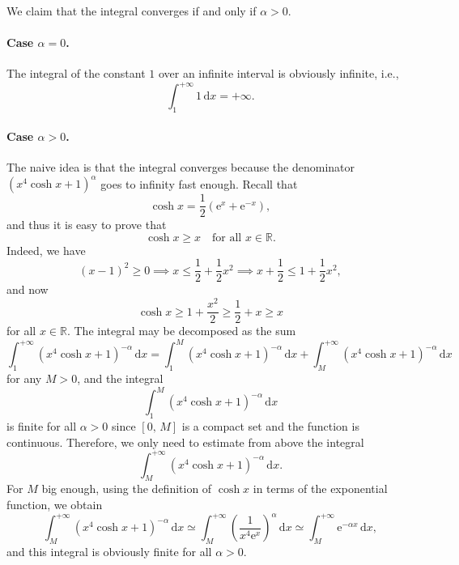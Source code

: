 \documentclass[a4paper,10 pt]{report}
\theoremstyle{definition}
\newcommand{\R}{\mathbb R}
\begin{document}
\begin{solutionBox} We claim that the integral converges if and only if $\alpha > 0$.

\paragraph{Case $\alpha = 0$.} The integral of the constant $1$ over an infinite interval is obviously infinite, i.e.,
\begin{equation*} \int_1^{+ \infty} 1 \, \mathrm{d}x = + \infty. \end{equation*}

\paragraph{Case $\alpha > 0$.} The naive idea is that the integral converges because the denominator $(x^4 \cosh x + 1)^\alpha$ goes to infinity fast enough. Recall that
\begin{equation*}\cosh x = \frac{1}{2} ( \mathrm{e}^x + \mathrm{e}^{-x} ), \end{equation*}
and thus it is easy to prove that
\begin{equation*} \cosh x \geq x \quad \text{for all $x \in \R$}. \end{equation*}
Indeed, we have
\begin{equation*} (x-1)^2 \geq 0 \implies x \leq \frac{1}{2} + \frac{1}{2} x^2 \implies x + \frac{1}{2} \leq 1 + \frac{1}{2}x^2, \end{equation*}
and now 
\begin{equation*} \cosh x \geq 1 + \frac{x^2}{2} \geq \frac{1}{2} +x \geq x \end{equation*}
for all $x \in \R$. The integral may be decomposed as the sum
\begin{equation*} \int_1^{+ \infty} \left( x^4 \cosh x + 1 \right)^{-\alpha} \, \mathrm{d}x = \int_1^M \left( x^4 \cosh x + 1 \right)^{-\alpha} \, \mathrm{d}x + \int_M^{+ \infty} \left( x^4 \cosh x + 1 \right)^{-\alpha} \, \mathrm{d}x \end{equation*}
for any $M > 0$, and the integral
\begin{equation*} \int_1^{M} \left( x^4 \cosh x + 1 \right)^{-\alpha} \, \mathrm{d}x \end{equation*}
is finite for all $\alpha > 0$ since $[0, \, M]$ is a compact set and the function is continuous. Therefore, we only need to estimate from above the integral
\begin{equation*} \int_M^{+ \infty} \left( x^4 \cosh x + 1 \right)^{-\alpha} \, \mathrm{d}x. \end{equation*}
For $M$ big enough, using the definition of $\cosh x$ in terms of the exponential function, we obtain
\begin{equation*} \int_M^{+ \infty} \left( x^4 \cosh x + 1 \right)^{-\alpha} \, \mathrm{d}x \simeq \int_M^{+ \infty} \left(\frac{1}{x^4 \mathrm{e}^x}\right)^\alpha \, \mathrm{d}x \simeq \int_M^{+ \infty} \mathrm{e}^{- \alpha x} \, \mathrm{d}x, \end{equation*}
and this integral is obviously finite for all $\alpha > 0$.


\end{solutionBox}
\end{document}
